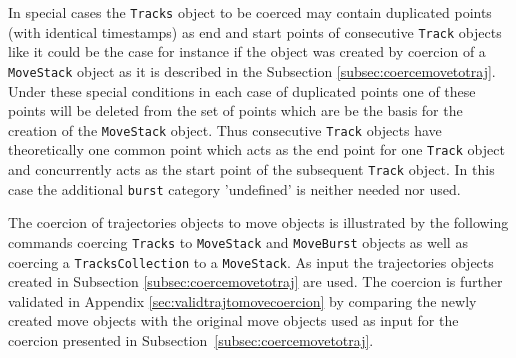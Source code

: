 \documentclass[12pt, oneside, a4paper]{scrbook}
\newcommand{\pkg}[1]{{\normalfont\fontseries{b}\selectfont #1}}
\let\code=\texttt
\begin{document}
In special cases the \code{Tracks} object to be coerced may contain duplicated points (with identical timestamps) as end and start points of consecutive \code{Track} objects like it could be the case for instance if the object was created by coercion of a \code{MoveStack} object as it is described in the Subsection \ref{subsec:coercemovetotraj}.
Under these special conditions in each case of duplicated points one of these points will be deleted from the set of points which are be the basis for the creation of the \code{MoveStack} object.
Thus consecutive \code{Track} objects have theoretically one common point which acts as the end point for one \code{Track} object and concurrently acts as the start point of the subsequent \code{Track} object.
In this case the additional \code{burst} category 'undefined' is neither needed nor used.

\par\medskip

The coercion of \pkg{trajectories} objects to \pkg{move} objects is illustrated by the following commands coercing \code{Tracks} to \code{MoveStack} and \code{MoveBurst} objects as well as coercing a \code{TracksCollection} to a \code{MoveStack}. As input the \pkg{trajectories} objects created in Subsection \ref{subsec:coercemovetotraj} are used. The coercion is further validated in Appendix \ref{sec:validtrajtomovecoercion} by comparing the newly created \pkg{move} objects with the original \pkg{move} objects used as input for the coercion presented in Subsection~\ref{subsec:coercemovetotraj}.

\end{document}
